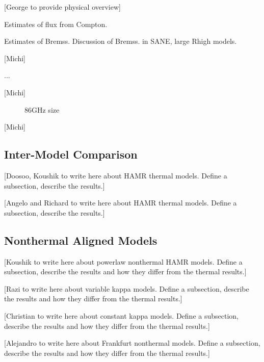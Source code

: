 [George to provide physical overview]

Estimates of flux from Compton.

Estimates of Bremss.  Discussion of Bremss. in SANE, large Rhigh models.

[Michi]


...

[Michi]


\begin{figure}
  \caption{86GHz size}
  \label{fig:cmp_86GHz_sz}
\end{figure}

[Michi]

\subsection{Inter-Model Comparison}



[Doosoo, Koushik to write here about HAMR thermal models.  Define a subsection, describe the results.]

[Angelo and Richard to write here about HAMR thermal models.  Define a subsection, describe the results.]


\subsection{Nonthermal Aligned Models}

[Koushik to write here about powerlaw nonthermal HAMR models.  Define a subsection, describe the results and how they differ from the thermal results.]

[Razi to write here about variable kappa models.  Define a subsection, describe the results and how they differ from the thermal results.]

[Christian to write here about constant kappa models.  Define a subsection, describe the results and how they differ from the thermal results.]

[Alejandro to write here about Frankfurt nonthermal models.  Define a subsection, describe the results and how they differ from the thermal results.]

